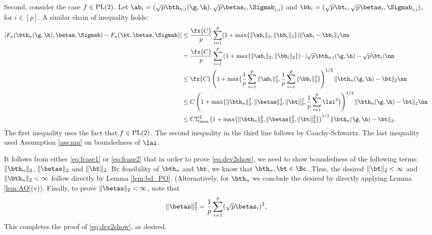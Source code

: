 Second, consider the case $f\in\rm{PL}(2)$. Let $\ab_i=(\sqrt{p}\bth_{n,i}(\g,\h),\sqrt{p}\betas_i,\Sigmab_{i,i})$ and $\bb_i=(\sqrt{p}\bt_i,\sqrt{p}\betas_i,\Sigmab_{i,i})$, for $i\in[p]$. A similar chain of inequality holds:
\begin{align}
|F_n(\bth_n(\g,\h),\betas,\Sigmab) - F_n(\bt,\betas,\Sigmab)| &\leq \frac{\fx{C}}{p}\sum_{i=1}^p (1+\max\{\|\ab_i\|_2,\|\bb_i\|_2\})\|\ab_i-\bb_i\|_2\nn \\
&= \frac{\fx{C}}{p}\sum_{i=1}^p \left(1+\max\{\|\ab_i\|_2,\|\bb_i\|_2\}\right)\cdot|\sqrt{p}\bth_{n,i}(\g,\h) - \sqrt{p}\bt_i|\nn\\
&\leq \fx{C}\left(1+\max\{\frac{1}{p}\sum_{i=1}^p \|\ab_i\|_2^{2},\frac{1}{p}\sum_{i=1}^p\|\bb_i\|_2^{2}\} \right)^{1/2}{\|\bth_n(\g,\h) - \bt\|_2}\nn\\
&\leq C\left(1+\max\{\|\bth_n\|_2^2,\|\betas\|_2^2,\|\bt\|_2^2,\frac{1}{p}\sum_{i=1}^p\lai^2\} \right)^{1/2}{\|\bth_n(\g,\h) - \bt\|_2}\nn\\
&\leq C\Sigma_{\max}^2\left(1+\max\{\|\bth_n\|_2^2,\|\betas\|_2^2,\|\bt\|_2^2\} \right)^{1/2}{\|\bth_n(\g,\h) - \bt\|_2}.\label{eq:fcase2}
\end{align}
The first inequality uses the fact that $f\in\rm{PL}(2)$. The second inequality in the third line follows by Cauchy-Schwartz. The last inequality used Assumption \ref{ass:mu} on boundedness of $\lai$.


It follows from either \eqref{eq:fcase1} or \eqref{eq:fcase2} that in order to prove \eqref{eq:dev2show}, we need to show boundedness of the following terms: $\|\bth_n\|_2$, $\|\betas\|_2$ and $\|\bt\|_2$. By feasibility of $\bth_n$ and $\bt$, we know that $\bth_n,\bt\in\Bc$. Thus, the desired $\|\bt\|_2<\infty$ and $\|\bth_n\|_2<\infty$ follow directly by Lemma \ref{lem:bd_PO}. (Alternatively, for $\bth_n$ we conclude the desired by directly applying Lemma \ref{lem:AO}(v)). Finally, to prove $\|\betas\|_2<\infty$, note that
$$
\|\betas\|_2^2 =\frac{1}{p}\sum_{i=1}^p(\sqrt{p}\betas_i)^2,
$$
 This completes the proof of \eqref{eq:dev2show}, as desired.


